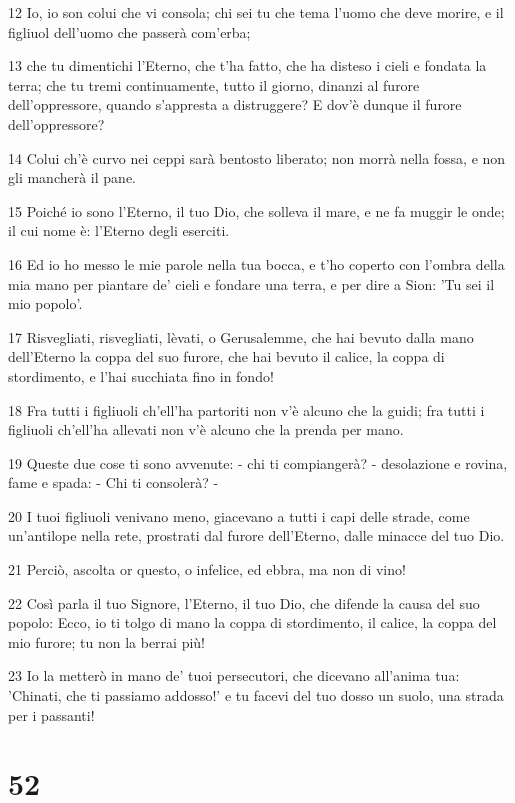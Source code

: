 \par 12 Io, io son colui che vi consola; chi sei tu che tema l'uomo che deve morire, e il figliuol dell'uomo che passerà com'erba;
\par 13 che tu dimentichi l'Eterno, che t'ha fatto, che ha disteso i cieli e fondata la terra; che tu tremi continuamente, tutto il giorno, dinanzi al furore dell'oppressore, quando s'appresta a distruggere? E dov'è dunque il furore dell'oppressore?
\par 14 Colui ch'è curvo nei ceppi sarà bentosto liberato; non morrà nella fossa, e non gli mancherà il pane.
\par 15 Poiché io sono l'Eterno, il tuo Dio, che solleva il mare, e ne fa muggir le onde; il cui nome è: l'Eterno degli eserciti.
\par 16 Ed io ho messo le mie parole nella tua bocca, e t'ho coperto con l'ombra della mia mano per piantare de' cieli e fondare una terra, e per dire a Sion: 'Tu sei il mio popolo'.
\par 17 Risvegliati, risvegliati, lèvati, o Gerusalemme, che hai bevuto dalla mano dell'Eterno la coppa del suo furore, che hai bevuto il calice, la coppa di stordimento, e l'hai succhiata fino in fondo!
\par 18 Fra tutti i figliuoli ch'ell'ha partoriti non v'è alcuno che la guidi; fra tutti i figliuoli ch'ell'ha allevati non v'è alcuno che la prenda per mano.
\par 19 Queste due cose ti sono avvenute: - chi ti compiangerà? - desolazione e rovina, fame e spada: - Chi ti consolerà? -
\par 20 I tuoi figliuoli venivano meno, giacevano a tutti i capi delle strade, come un'antilope nella rete, prostrati dal furore dell'Eterno, dalle minacce del tuo Dio.
\par 21 Perciò, ascolta or questo, o infelice, ed ebbra, ma non di vino!
\par 22 Così parla il tuo Signore, l'Eterno, il tuo Dio, che difende la causa del suo popolo: Ecco, io ti tolgo di mano la coppa di stordimento, il calice, la coppa del mio furore; tu non la berrai più!
\par 23 Io la metterò in mano de' tuoi persecutori, che dicevano all'anima tua: 'Chinati, che ti passiamo addosso!' e tu facevi del tuo dosso un suolo, una strada per i passanti!

\chapter{52}

